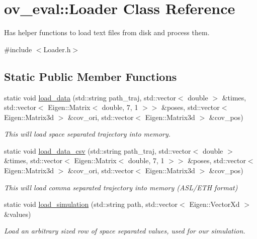 \hypertarget{classov__eval_1_1Loader}{}\section{ov\+\_\+eval\+:\+:Loader Class Reference}
\label{classov__eval_1_1Loader}


Has helper functions to load text files from disk and process them.  




{\ttfamily \#include $<$Loader.\+h$>$}

\subsection*{Static Public Member Functions}
\begin{DoxyCompactItemize}
\item 
static void \hyperlink{classov__eval_1_1Loader_afdd99379f29b052ecf7bf197d21a911f}{load\+\_\+data} (std\+::string path\+\_\+traj, std\+::vector$<$ double $>$ \&times, std\+::vector$<$ Eigen\+::\+Matrix$<$ double, 7, 1 $>$$>$ \&poses, std\+::vector$<$ Eigen\+::\+Matrix3d $>$ \&cov\+\_\+ori, std\+::vector$<$ Eigen\+::\+Matrix3d $>$ \&cov\+\_\+pos)
\begin{DoxyCompactList}\small\item\em This will load {\itshape space} separated trajectory into memory. \end{DoxyCompactList}\item 
static void \hyperlink{classov__eval_1_1Loader_abcb07f7d33c1ed0e9996775188861d87}{load\+\_\+data\+\_\+csv} (std\+::string path\+\_\+traj, std\+::vector$<$ double $>$ \&times, std\+::vector$<$ Eigen\+::\+Matrix$<$ double, 7, 1 $>$$>$ \&poses, std\+::vector$<$ Eigen\+::\+Matrix3d $>$ \&cov\+\_\+ori, std\+::vector$<$ Eigen\+::\+Matrix3d $>$ \&cov\+\_\+pos)
\begin{DoxyCompactList}\small\item\em This will load {\itshape comma} separated trajectory into memory (A\+S\+L/\+E\+TH format) \end{DoxyCompactList}\item 
static void \hyperlink{classov__eval_1_1Loader_a6ecab01ce0d594bc3a635925ea8a7321}{load\+\_\+simulation} (std\+::string path, std\+::vector$<$ Eigen\+::\+Vector\+Xd $>$ \&values)
\begin{DoxyCompactList}\small\item\em Load an arbitrary sized row of {\itshape space} separated values, used for our simulation. \end{DoxyCompactList}\item 

\end{DoxyCompactItemize}
